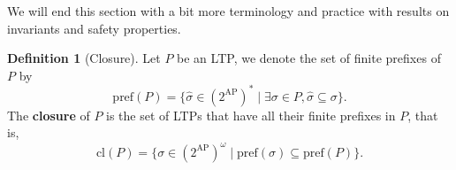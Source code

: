 \documentclass{tufte-handout} %
\newtheorem{lem}[thm]{Lemma}
\theoremstyle{definition}
\newtheorem{defn}[thm]{Definition}
\theoremstyle{remark}
\newcommand{\N}{\mathbb{N}}
\newcommand{\0}{\textsf{0}}
\newcommand{\1}{\textsf{1}}
\newcommand{\AP}{\text{AP}}
\newcommand{\pref}{\text{pref}}
\newcommand{\cl}{\text{cl}}
\begin{document}
%	
%	
%	
%	
We will end this section with a bit more terminology and practice with results on invariants and safety properties.
\begin{defn}[Closure]\label{defn-prefixesandclosure}
	Let $P$ be an LTP, we denote the set of finite prefixes of $P$ by \[\pref(P) = \{\hat{\sigma} \in (2^{\AP})^* \mid \exists \sigma \in P, \hat{\sigma} \subseteq \sigma \}.\] %
	The \textbf{closure} of $P$ is the set of LTPs that have all their finite prefixes in $P$, that is,
	\[ \cl(P) = \{\sigma \in (2^{\AP})^{\omega} \mid \pref(\sigma) \subseteq \pref(P)\}.\]
\end{defn}
\end{document}
